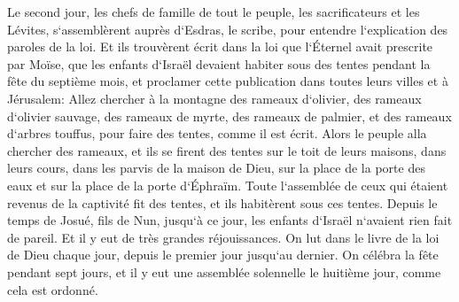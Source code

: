 \verse Le second jour, les chefs de famille de tout le peuple, les sacrificateurs et les Lévites, s`assemblèrent auprès d`Esdras, le scribe, pour entendre l`explication des paroles de la loi. 
\verse Et ils trouvèrent écrit dans la loi que l`Éternel avait prescrite par Moïse, que les enfants d`Israël devaient habiter sous des tentes pendant la fête du septième mois, 
\verse et proclamer cette publication dans toutes leurs villes et à Jérusalem: Allez chercher à la montagne des rameaux d`olivier, des rameaux d`olivier sauvage, des rameaux de myrte, des rameaux de palmier, et des rameaux d`arbres touffus, pour faire des tentes, comme il est écrit. 
\verse Alors le peuple alla chercher des rameaux, et ils se firent des tentes sur le toit de leurs maisons, dans leurs cours, dans les parvis de la maison de Dieu, sur la place de la porte des eaux et sur la place de la porte d`Éphraïm. 
\verse Toute l`assemblée de ceux qui étaient revenus de la captivité fit des tentes, et ils habitèrent sous ces tentes. Depuis le temps de Josué, fils de Nun, jusqu`à ce jour, les enfants d`Israël n`avaient rien fait de pareil. Et il y eut de très grandes réjouissances. 
\verse On lut dans le livre de la loi de Dieu chaque jour, depuis le premier jour jusqu`au dernier. On célébra la fête pendant sept jours, et il y eut une assemblée solennelle le huitième jour, comme cela est ordonné. 


